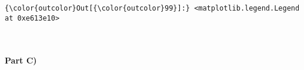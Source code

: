 \documentclass[11pt]{article}
\begin{document}
\begin{Verbatim}[commandchars=\\\{\}]
{\color{outcolor}Out[{\color{outcolor}99}]:} <matplotlib.legend.Legend at 0xe613e10>
\end{Verbatim}
            
    \begin{center}
    \end{center}
    { \hspace*{\fill} \\}
    
    \paragraph{Part C)}\label{part-c}
\end{document}
